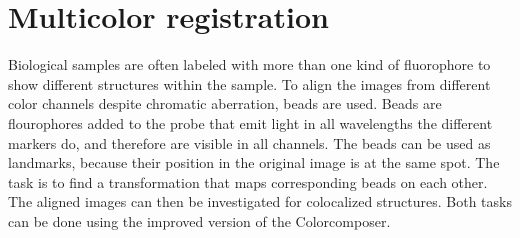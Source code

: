 \chapter{Multicolor registration}
Biological samples are often labeled with more than one kind of fluorophore to show different structures within the sample. To align the images from
different color channels despite chromatic aberration, beads are used. Beads are
flourophores added to the probe that emit light in all wavelengths the
different markers do, and therefore are visible in all channels. The beads can be
used as landmarks, because their position in the original image is at the same
spot. The task is to find a transformation that maps corresponding beads on each
other.\newline
The aligned images can then be investigated for colocalized structures.\newline
Both tasks can be done using the improved version of the Colorcomposer.


